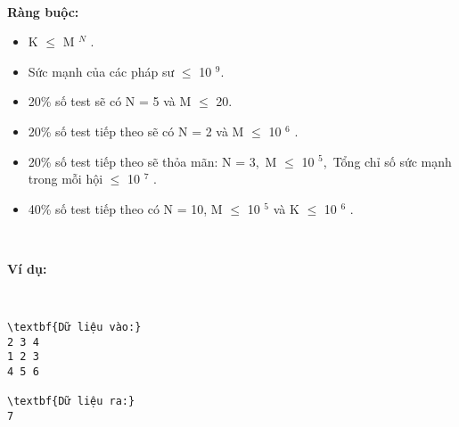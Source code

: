  

\textbf{Ràng buộc: }
\begin{itemize}
	\item K  $\le$  M $^ N $ .
	\item Sức mạnh của các pháp sư  $\le$  10 $^ 9. $
	\item 

20\% số test sẽ có N = 5 và M  $\le$  20.
	\item 

20\% số test tiếp theo sẽ có N = 2 và M  $\le$  10 $^ 6 $ .
	\item 

20\% số test tiếp theo sẽ thỏa mãn: N = 3, M  $\le$  10 $^ 5 $, Tổng chỉ số sức mạnh trong mỗi hội  $\le$  10 $^ 7 $ .
	\item 

40\% số test tiếp theo có N = 10, M  $\le$  10 $^ 5 $ và K  $\le$  10 $^ 6 $ .
\end{itemize}

 

\textbf{Ví dụ: }

 
\begin{verbatim}
\textbf{Dữ liệu vào:}
2 3 4
1 2 3
4 5 6

\textbf{Dữ liệu ra:}
7\end{verbatim}

